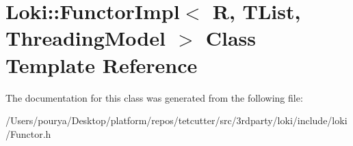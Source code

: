 \hypertarget{classLoki_1_1FunctorImpl}{}\section{Loki\+:\+:Functor\+Impl$<$ R, T\+List, Threading\+Model $>$ Class Template Reference}
\label{classLoki_1_1FunctorImpl}


The documentation for this class was generated from the following file\+:\begin{DoxyCompactItemize}
\item 
/\+Users/pourya/\+Desktop/platform/repos/tetcutter/src/3rdparty/loki/include/loki/Functor.\+h\end{DoxyCompactItemize}
